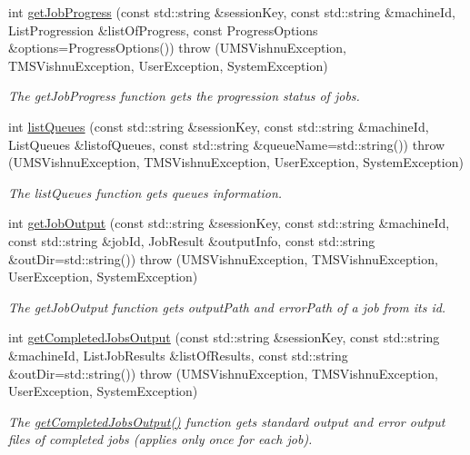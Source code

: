 \begin{DoxyCompactItemize}
int \hyperlink{namespacevishnu_a5bc51ba53a335079d0b7044cc2c8f4cc}{getJobProgress} (const std::string \&sessionKey, const std::string \&machineId, ListProgression \&listOfProgress, const ProgressOptions \&options=ProgressOptions())  throw (UMSVishnuException, TMSVishnuException, UserException, SystemException)
\begin{DoxyCompactList}\small\item\em The getJobProgress function gets the progression status of jobs. \item\end{DoxyCompactList}\item 
int \hyperlink{namespacevishnu_ada2d98155cffa475261261fb33f7e873}{listQueues} (const std::string \&sessionKey, const std::string \&machineId, ListQueues \&listofQueues, const std::string \&queueName=std::string())  throw (UMSVishnuException, TMSVishnuException, UserException, SystemException)
\begin{DoxyCompactList}\small\item\em The listQueues function gets queues information. \item\end{DoxyCompactList}\item 
int \hyperlink{namespacevishnu_a6e0b3df33a91bd16cdadf3ac428fcf0e}{getJobOutput} (const std::string \&sessionKey, const std::string \&machineId, const std::string \&jobId, JobResult \&outputInfo, const std::string \&outDir=std::string())  throw (UMSVishnuException, TMSVishnuException, UserException, SystemException)
\begin{DoxyCompactList}\small\item\em The getJobOutput function gets outputPath and errorPath of a job from its id. \item\end{DoxyCompactList}\item 
int \hyperlink{namespacevishnu_aaedc4b5676f0c8e47f333316cff0b0a8}{getCompletedJobsOutput} (const std::string \&sessionKey, const std::string \&machineId, ListJobResults \&listOfResults, const std::string \&outDir=std::string())  throw (UMSVishnuException, TMSVishnuException, UserException, SystemException)
\begin{DoxyCompactList}\small\item\em The \hyperlink{namespacevishnu_aaedc4b5676f0c8e47f333316cff0b0a8}{getCompletedJobsOutput()} function gets standard output and error output files of completed jobs (applies only once for each job). \item\end{DoxyCompactList}\item 

\end{DoxyCompactItemize}

